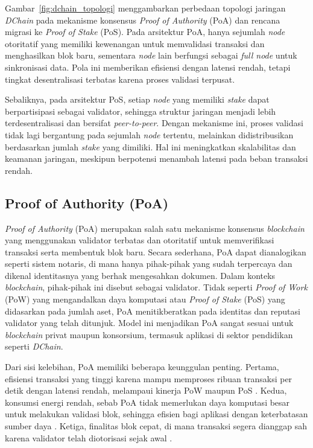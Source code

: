 Gambar~\ref{fig:dchain_topologi} menggambarkan perbedaan topologi jaringan \textit{DChain} pada mekanisme konsensus \textit{Proof of Authority} (PoA) dan rencana migrasi ke \textit{Proof of Stake} (PoS). Pada arsitektur PoA, hanya sejumlah \textit{node} otoritatif yang memiliki kewenangan untuk memvalidasi transaksi dan menghasilkan blok baru, sementara \textit{node} lain berfungsi sebagai \textit{full node} untuk sinkronisasi data. Pola ini memberikan efisiensi dengan latensi rendah, tetapi tingkat desentralisasi terbatas karena proses validasi terpusat.

Sebaliknya, pada arsitektur PoS, setiap \textit{node} yang memiliki \textit{stake} dapat berpartisipasi sebagai validator, sehingga struktur jaringan menjadi lebih terdesentralisasi dan bersifat \textit{peer-to-peer}. Dengan mekanisme ini, proses validasi tidak lagi bergantung pada sejumlah \textit{node} tertentu, melainkan didistribusikan berdasarkan jumlah \textit{stake} yang dimiliki. Hal ini meningkatkan skalabilitas dan keamanan jaringan, meskipun berpotensi menambah latensi pada beban transaksi rendah.

\subsection{Proof of Authority (PoA)}

\textit{Proof of Authority} (PoA) merupakan salah satu mekanisme konsensus \textit{blockchain} yang menggunakan validator terbatas dan otoritatif untuk memverifikasi transaksi serta membentuk blok baru. Secara sederhana, PoA dapat dianalogikan seperti sistem notaris, di mana hanya pihak-pihak yang sudah terpercaya dan dikenal identitasnya yang berhak mengesahkan dokumen. Dalam konteks \textit{blockchain}, pihak-pihak ini disebut sebagai validator. Tidak seperti \textit{Proof of Work} (PoW) yang mengandalkan daya komputasi atau \textit{Proof of Stake} (PoS) yang didasarkan pada jumlah aset, PoA menitikberatkan pada identitas dan reputasi validator yang telah ditunjuk. Model ini menjadikan PoA sangat sesuai untuk \textit{blockchain} privat maupun konsorsium, termasuk aplikasi di sektor pendidikan seperti \textit{DChain}.

Dari sisi kelebihan, PoA memiliki beberapa keunggulan penting. Pertama, efisiensi transaksi yang tinggi karena mampu memproses ribuan transaksi per detik dengan latensi rendah, melampaui kinerja PoW maupun PoS \cite{reshi2025, joshi2021, chikezie2021}. Kedua, konsumsi energi rendah, sebab PoA tidak memerlukan daya komputasi besar untuk melakukan validasi blok, sehingga efisien bagi aplikasi dengan keterbatasan sumber daya \cite{reshi2025, joshi2021, sytnyk2024}. Ketiga, finalitas blok cepat, di mana transaksi segera dianggap sah karena validator telah diotorisasi sejak awal \cite{joshi2021, chikezie2021}.

